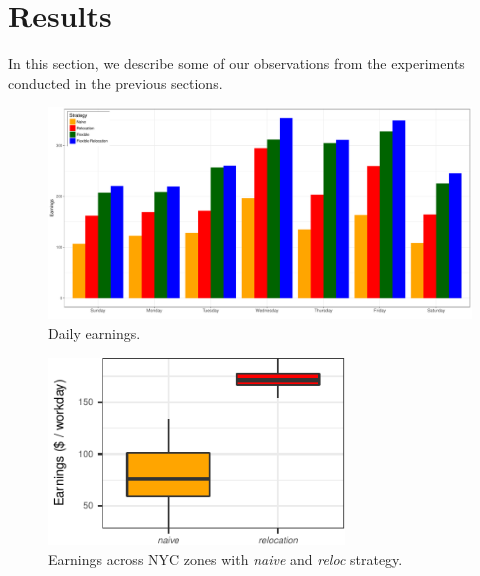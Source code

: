
\section{Results}
\label{sec:results}


In this section, we describe some of our observations from the experiments conducted in the previous sections.




\begin{figure}
	\label{fig:daily_earnings}
	\caption{Daily earnings.}
	\includegraphics[scale=0.4]{figures/daily_earnings.pdf}
\end{figure}

\begin{figure}
	\label{fig:earnings_heatmap}
	\caption{Earnings across NYC zones with \textit{naive} and \textit{reloc} strategy.}
	\includegraphics[width=0.7\textwidth,height=0.3\textwidth]{figures/earnings_heatmap.pdf}
\end{figure}

